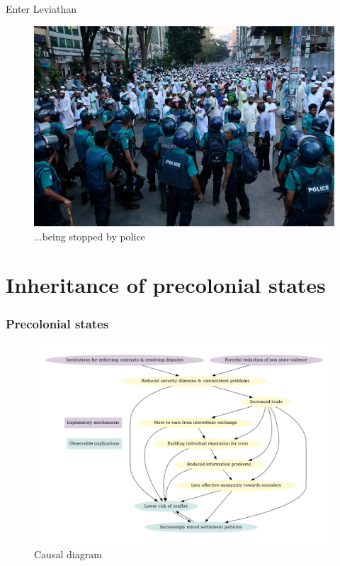 \documentclass{beamer}
\begin{document}
\begin{frame}{Enter Leviathan}

\begin{figure}[htpb]
	\centering
	\includegraphics[width=\linewidth]{img/AP.png}
	\caption{...being stopped by police}%
	\label{AP}
\end{figure}	

\end{frame}

\section{Inheritance of precolonial states}

\begin{frame}
\frametitle{Precolonial states} 

\begin{figure}[htpb]
	\centering
	\includegraphics[width=.8\linewidth]{img/OMTcausal.png}
	\caption{Causal diagram}%
	\label{causal}
\end{figure}
\end{frame}
\end{document}
